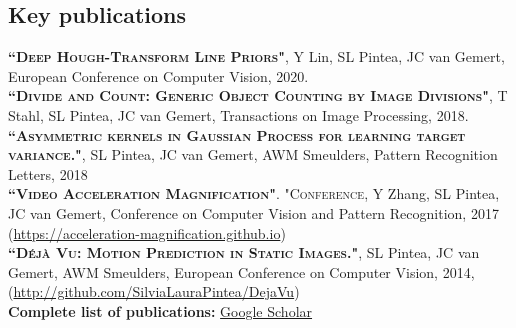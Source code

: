 \documentclass[a4paper, oneside, final]{scrartcl}
\begin{document}
\begin{center}
		\section{Key publications}
        \begin{flushleft}
			\textsc{\textbf{``Deep Hough-Transform Line Priors"}}, Y Lin, SL Pintea, JC van Gemert, 
            European Conference on Computer Vision, 2020.\\[3px]
			\textsc{\textbf{``Divide and Count: Generic Object Counting by Image Divisions"}}, T Stahl, SL Pintea, JC van Gemert, 
            Transactions on Image Processing, 2018.\\[3px]
			\textsc{\textbf{``Asymmetric kernels in Gaussian Process for learning target variance."}}, SL Pintea, JC van Gemert, AWM Smeulders, 
            Pattern Recognition Letters, 2018\\[3px] 
			\textsc{\textbf{``Video Acceleration Magnification"}}. "\textsc{Conference}, Y Zhang, SL Pintea, JC van Gemert, 
            Conference on Computer Vision and Pattern Recognition, 2017 
            (\small\href{https://acceleration-magnification.github.io}{https://acceleration-magnification.github.io}) \\[3px]
            \textsc{\textbf{``D\'{e}j\`{a} Vu: Motion Prediction in Static Images."}}, SL Pintea, JC van Gemert, AWM Smeulders, 
            European Conference on Computer Vision, 2014, 
            (\small\href{http://github.com/SilviaLauraPintea/DejaVu}{http://github.com/SilviaLauraPintea/DejaVu})\\[10px]

            \textbf{Complete list of publications:} \href{https://scholar.google.nl/citations?user=shTkx9EAAAAJ&hl=en}{Google Scholar}\\
        \end{flushleft}

\end{center}
\end{document}
